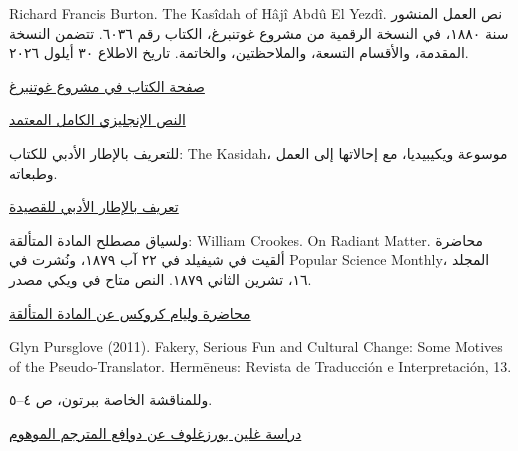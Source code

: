 
\textenglish{Richard Francis Burton. The Kasîdah of Hâjî Abdû El Yezdî}. نص العمل المنشور سنة ١٨٨٠، في النسخة الرقمية من مشروع غوتنبرغ، الكتاب رقم ٦٠٣٦. تتضمن النسخة المقدمة، والأقسام التسعة، والملاحظتين، والخاتمة. تاريخ الاطلاع ٣٠ أيلول ٢٠٢٦.

\href{https://www.gutenberg.org/ebooks/6036}{صفحة الكتاب في مشروع غوتنبرغ}

\href{https://www.gutenberg.org/cache/epub/6036/pg6036-images.html}{النص الإنجليزي الكامل المعتمد}

للتعريف بالإطار الأدبي للكتاب: \textenglish{The Kasidah}، موسوعة ويكيبيديا، مع إحالاتها إلى العمل وطبعاته.

\href{https://en.wikipedia.org/wiki/The\_Kasidah}{تعريف بالإطار الأدبي للقصيدة}

ولسياق مصطلح المادة المتألقة: \textenglish{William Crookes. On Radiant Matter}. محاضرة ألقيت في شيفيلد في ٢٢ آب ١٨٧٩، ونُشرت في \textenglish{Popular Science Monthly}، المجلد ١٦، تشرين الثاني ١٨٧٩. النص متاح في ويكي مصدر.

\href{https://en.wikisource.org/wiki/On\_Radiant\_Matter}{محاضرة وليام كروكس عن المادة المتألقة}


\begin{english}
Glyn Pursglove (2011). Fakery, Serious Fun and Cultural Change: Some Motives of the Pseudo-Translator. Hermēneus: Revista de Traducción e Interpretación, 13.
\end{english}

وللمناقشة الخاصة ببرتون، ص ٤–٥.

\href{https://www5.uva.es/hermeneus/hermeneus/13/arti06_13.pdf}{دراسة غلين بورزغلوف عن دوافع المترجم الموهوم}
